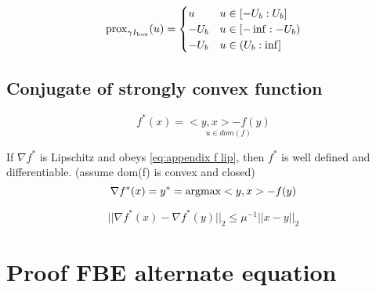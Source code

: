 		\begin{equation}
			\operatorname{prox}_{\gamma I_{\operatorname{box}}}(u)=
			\begin{cases}
				u & u \in [-U_b:U_b]\\
				-U_b & u \in [-\inf:-U_b)\\
				-U_b & u \in (U_b:\inf]\\
			\end{cases}
		\end{equation}
	\section{Conjugate of strongly convex function}
		\begin{equation}
			f^*(x)= \underset{u \in dom(f)}{<y,x>-f(y)}
		\end{equation}
		
		If $\nabla f^*$ is Lipschitz and obeys \eqref{eq:appendix f lip}, then $f^*$ is well defined and differentiable. (assume dom(f) is convex and closed)
		\begin{equation}
			\nabla f^*(x) = y^* = \operatorname{argmax} <y,x> - f(y)
		\end{equation}
		
		\begin{equation}
			|| \nabla f^*(x) - \nabla f^*(y) ||_2 \leq \mu^{-1} ||x-y||_2
			\label{eq:appendix f lip}
		\end{equation}
		
\chapter{Proof FBE alternate equation}

